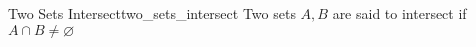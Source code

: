 \begin{definition}{Two Sets Intersect}{two_sets_intersect}
Two sets \( A, B \) are said to intersect if \( A \cap  B \neq \varnothing  \) 
\end{definition}
